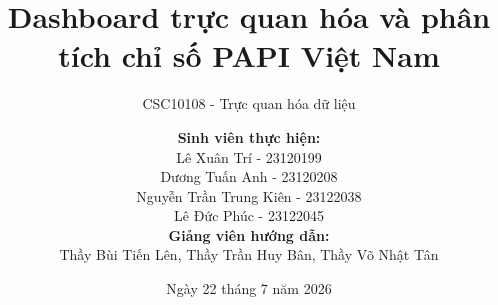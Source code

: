 \title[PAPI Việt Nam]{Dashboard trực quan hóa và phân tích chỉ số PAPI Việt Nam}
\subtitle{CSC10108 - Trực quan hóa dữ liệu}

\author[Nhóm thực hiện]{\texorpdfstring{\footnotesize
\textbf{Sinh viên thực hiện:}\\
Lê Xuân Trí - 23120199 \\
Dương Tuấn Anh - 23120208 \\
Nguyễn Trần Trung Kiên - 23122038 \\
Lê Đức Phúc - 23122045 \\
\vspace{0.1cm}
\textbf{Giảng viên hướng dẫn:}\\
Thầy Bùi Tiến Lên, Thầy Trần Huy Bân, Thầy Võ Nhật Tân
}{Lê Xuân Trí; Dương Tuấn Anh; Nguyễn Trần Trung Kiên; Lê Đức Phúc}}


\date[22/07/2026]{Ngày 22 tháng 7 năm 2026}
